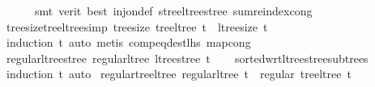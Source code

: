 \begin{isabellebody}
\ \ \ \ \ \ smt\ {\isacharparenleft}{\kern0pt}verit{\isacharcomma}{\kern0pt}\ best{\isacharparenright}{\kern0pt}\ inj{\isacharunderscore}{\kern0pt}on{\isacharunderscore}{\kern0pt}def\ stree{\isacharunderscore}{\kern0pt}ltree{\isacharunderscore}{\kern0pt}stree\ sum{\isachardot}{\kern0pt}reindex{\isacharunderscore}{\kern0pt}cong{\isacharparenright}{\kern0pt}%
\endisatagproof
{\isafoldproof}%
%
\isadelimproof
\isanewline
%
\endisadelimproof
\isanewline
{}\isamarkupfalse%
\ tree{\isacharunderscore}{\kern0pt}size{\isacharunderscore}{\kern0pt}tree{\isacharunderscore}{\kern0pt}ltree{\isacharbrackleft}{\kern0pt}simp{\isacharbrackright}{\kern0pt}{\isacharcolon}{\kern0pt}\ {\isachardoublequoteopen}tree{\isacharunderscore}{\kern0pt}size\ {\isacharparenleft}{\kern0pt}tree{\isacharunderscore}{\kern0pt}ltree\ t{\isacharparenright}{\kern0pt}\ {\isacharequal}{\kern0pt}\ ltree{\isacharunderscore}{\kern0pt}size\ t{\isachardoublequoteclose}\isanewline
%
\isadelimproof
\ \ %
\endisadelimproof
%
\isatagproof
{}\isamarkupfalse%
\ {\isacharparenleft}{\kern0pt}induction\ t{\isacharparenright}{\kern0pt}\ {\isacharparenleft}{\kern0pt}auto{\isacharcomma}{\kern0pt}\ metis\ comp{\isacharunderscore}{\kern0pt}eq{\isacharunderscore}{\kern0pt}dest{\isacharunderscore}{\kern0pt}lhs\ map{\isacharunderscore}{\kern0pt}cong{\isacharparenright}{\kern0pt}%
\endisatagproof
{\isafoldproof}%
%
\isadelimproof
\isanewline
%
\endisadelimproof
\isanewline
{}\isamarkupfalse%
\ regular{\isacharunderscore}{\kern0pt}ltree{\isacharunderscore}{\kern0pt}stree{\isacharcolon}{\kern0pt}\ {\isachardoublequoteopen}regular{\isacharunderscore}{\kern0pt}ltree\ {\isacharparenleft}{\kern0pt}ltree{\isacharunderscore}{\kern0pt}stree\ t{\isacharparenright}{\kern0pt}{\isachardoublequoteclose}\isanewline
%
\isadelimproof
\ \ %
\endisadelimproof
%
\isatagproof
{}\isamarkupfalse%
\ sorted{\isacharunderscore}{\kern0pt}wrt{\isacharunderscore}{\kern0pt}ltree{\isacharunderscore}{\kern0pt}stree{\isacharunderscore}{\kern0pt}subtrees\ \isamarkupfalse%
\ {\isacharparenleft}{\kern0pt}induction\ t{\isacharparenright}{\kern0pt}\ auto%
\endisatagproof
{\isafoldproof}%
%
\isadelimproof
\isanewline
%
\endisadelimproof
\isanewline
{}\isamarkupfalse%
\ regular{\isacharunderscore}{\kern0pt}tree{\isacharunderscore}{\kern0pt}ltree{\isacharcolon}{\kern0pt}\ {\isachardoublequoteopen}regular{\isacharunderscore}{\kern0pt}ltree\ t\ {\isasymLongrightarrow}\ regular\ {\isacharparenleft}{\kern0pt}tree{\isacharunderscore}{\kern0pt}ltree\ t{\isacharparenright}{\kern0pt}{\isachardoublequoteclose}\isanewline

\end{isabellebody}
